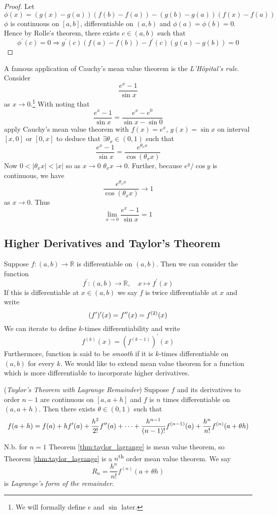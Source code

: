 \documentclass[10pt, a4paper, twoside]{report}
\begin{document}
\begin{proof}
    Let 
    \[\phi(x)=(g(x)-g(a))(f(b)-f(a))-(g(b)-g(a))(f(x)-f(a))\]
    \(\phi\) is continuous on \([a,b]\), differentiable on \((a,b)\) and \(\phi(a)=\phi(b)=0\). Hence by Rolle's theorem, there exists \(c\in(a,b)\) such that
    \[\phi^\prime(c)=0\Rightarrow g^\prime(c)(f(a)-f(b))-f^\prime(c)(g(a)-g(b))=0\]
\end{proof}
A famous application of Cauchy's mean value theorem is the \emph{L'Hôpital's rule}. Consider
\[\frac{e^x-1}{\sin x}\]
as \(x\to 0\).\footnote{We will formally define \(e\) and \(\sin\) later.} With noting that 
\[\frac{e^x-1}{\sin x}=\frac{e^x-e^0}{\sin x-\sin 0}\]
apply Cauchy's mean value theorem with \(f(x)=e^x\), \(g(x)=\sin x\) on interval \([x,0]\) or \([0,x]\) to deduce that \(\exists\theta_x\in(0,1)\) such that 
\[\frac{e^x-1}{\sin x}=\frac{e^{\theta_xx}}{\cos(\theta_xx)}\]
Now \(0<|\theta_xx|<|x|\) so as \(x\to 0\) \(\theta_xx\to 0\). Further, because \(e^y/\cos y\) is continuous, we have 
\[\frac{e^{\theta_xx}}{\cos(\theta_xx)}\to 1\]
as \(x\to 0\). Thus
\[\lim_{x\to 0}\frac{e^x-1}{\sin x}=1\]
\subsection{Higher Derivatives and Taylor's Theorem}
Suppose \(f:(a,b)\to\mathbb{R}\) is differentiable on \((a,b)\). Then we can consider the function 
\[f^\prime:(a,b)\to\mathbb{R},\quad x\mapsto f^\prime(x)\]
If this is differentiable at \(x\in(a,b)\) we say \(f\) is twice differentiable at \(x\) and write 
\[(f^\prime)^\prime(x)=f^{\prime\prime}(x)=f^{(2)}(x)\]
We can iterate to define \(k\)-times differentiability and write 
\[f^{(k)}(x)=\left(f^{(k-1)}\right)^\prime(x)\]
Furthermore, function is said to be \emph{smooth} if it is \(k\)-times differentiable on \((a,b)\) for every \(k\). We would like to extend mean value theorem for a function which is more differentiable to incorporate higher derivatives.
\begin{theorem}
    (\emph{Taylor's Theorem with Lagrange Remainder})
    Suppose \(f\) and its derivatives to order \(n-1\) are continuous on \([a,a+h]\) and \(f\) is \(n\) times differentiable on \((a,a+h)\). Then there exists \(\theta\in(0,1)\) such that 
    \[f(a+h)=f(a)+hf^\prime(a)+\frac{h^2}{2!}f^{\prime\prime}(a)+\cdots+\frac{h^{n-1}}{(n-1)!}f^{(n-1)}(a)+\frac{h^n}{n!}f^{(n)}(a+\theta h)\]
    \label{thm:taylor_lagrange}
\end{theorem}
N.b. for \(n=1\) Theorem \ref{thm:taylor_lagrange} is mean value theorem, so Theorem \ref{thm:taylor_lagrange} is a \(n\)\textsuperscript{th} order mean value theorem. We say 
\[R_n=\frac{h^n}{n!}f^{(n)}(a+\theta h)\]
is \emph{Lagrange's form of the remainder}. 
\end{document}
